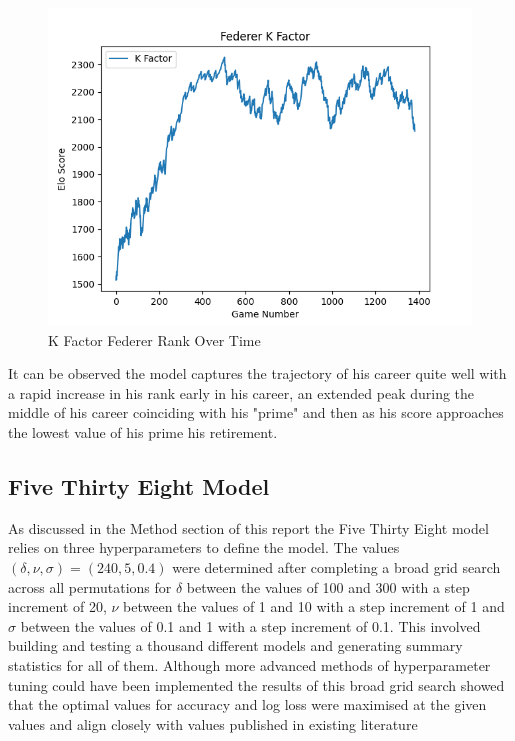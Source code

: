 \documentclass[12pt,a4paper]{article}
\begin{document}
\begin{figure}[H]
  \centering
  \includegraphics[scale=0.8]{images/federer_k_factor.png}
  \caption{K Factor Federer Rank Over Time}
  \label{fig:federer-kfactor}
\end{figure}

It can be observed the model captures the trajectory of his career quite well with a rapid increase
in his rank early in his career, an extended peak
during the middle of his career coinciding with his "prime" and then as his score approaches the lowest
value of his prime his retirement.

\subsection{Five Thirty Eight Model}
As discussed in the Method section of this report the Five Thirty Eight model relies on
three hyperparameters to define the model. The values $(\delta,\nu,\sigma) = (240,5,0.4)$
were determined after completing a broad grid search across all permutations for $\delta$
between the values of 100 and 300 with a step increment of 20, $\nu$ between the values of
1 and 10 with a step increment of 1 and $\sigma$ between the values of 0.1 and 1 with a
step increment of 0.1. This involved building and testing a thousand different models
and generating summary statistics for all of them. Although more advanced methods of
hyperparameter tuning could have been implemented the results of this broad grid search
showed that the optimal values for accuracy and log loss were maximised at the given values
and align closely with values published in existing literature \cite{kovalchik_searching_2016}
\end{document}
